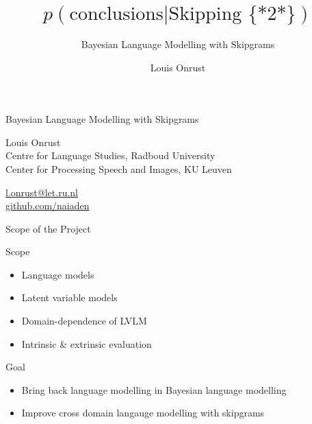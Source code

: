 \def\CC{{C\nolinebreak[4]\hspace{-.05em}\raisebox{.4ex}{\tiny\bf ++}}}
\usepackage{multirow}

\author{Louis Onrust}
\title{$p(\text{conclusions} | \text{Skipping \{*2*\}})$}
\subtitle{Bayesian Language Modelling with Skipgrams}
\date{}


\begin{frame}
    \titlepage
\end{frame}
\note[itemize]{
}

\begin{frame}{Bayesian Language Modelling with Skipgrams}
    \begin{block}{}
        Louis Onrust \\
        Centre for Language Studies, Radboud University \\
        Center for Processing Speech and Images, KU Leuven
    \end{block}

    \begin{block}{}
        \href{mailto:l.onrust@let.ru.nl}{l.onrust@let.ru.nl} \\
        \href{https://github.com/naiaden}{github.com/naiaden}
    \end{block}
\end{frame}
\note[itemize]{
}

\begin{frame}{Scope of the Project}
    \begin{block}{Scope}
        \begin{itemize}
            \item Language models
            \item Latent variable models
            \item Domain-dependence of LVLM
            \item Intrinsic \& extrinsic evaluation
        \end{itemize}
    \end{block}

    \begin{block}{Goal}
        \begin{itemize}
            \item Bring back language modelling in Bayesian language modelling
            \item Improve cross domain langauge modelling with skipgrams
        \end{itemize}
    \end{block}
\end{frame}
\note[itemize]{
}

